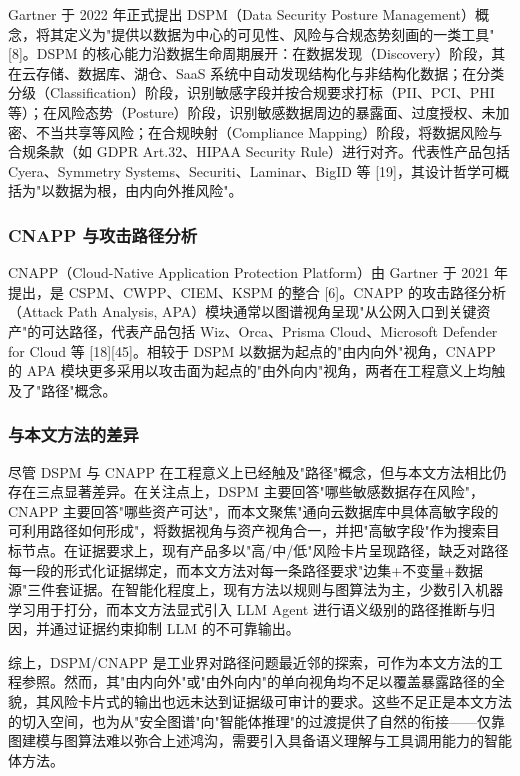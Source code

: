\documentclass[a4paper,12pt]{ctexart}
\begin{document}
Gartner 于 2022 年正式提出 DSPM（Data Security Posture Management）概念，将其定义为"提供以数据为中心的可见性、风险与合规态势刻画的一类工具" [8]。DSPM 的核心能力沿数据生命周期展开：在数据发现（Discovery）阶段，其在云存储、数据库、湖仓、SaaS 系统中自动发现结构化与非结构化数据；在分类分级（Classification）阶段，识别敏感字段并按合规要求打标（PII、PCI、PHI 等）；在风险态势（Posture）阶段，识别敏感数据周边的暴露面、过度授权、未加密、不当共享等风险；在合规映射（Compliance Mapping）阶段，将数据风险与合规条款（如 GDPR Art.32、HIPAA Security Rule）进行对齐。代表性产品包括 Cyera、Symmetry Systems、Securiti、Laminar、BigID 等 [19]，其设计哲学可概括为"以数据为根，由内向外推风险"。

\subsubsection{CNAPP 与攻击路径分析}

CNAPP（Cloud-Native Application Protection Platform）由 Gartner 于 2021 年提出，是 CSPM、CWPP、CIEM、KSPM 的整合 [6]。CNAPP 的攻击路径分析（Attack Path Analysis, APA）模块通常以图谱视角呈现"从公网入口到关键资产"的可达路径，代表产品包括 Wiz、Orca、Prisma Cloud、Microsoft Defender for Cloud 等 [18][45]。相较于 DSPM 以数据为起点的"由内向外"视角，CNAPP 的 APA 模块更多采用以攻击面为起点的"由外向内"视角，两者在工程意义上均触及了"路径"概念。

\subsubsection{与本文方法的差异}

尽管 DSPM 与 CNAPP 在工程意义上已经触及"路径"概念，但与本文方法相比仍存在三点显著差异。在关注点上，DSPM 主要回答"哪些敏感数据存在风险"，CNAPP 主要回答"哪些资产可达"，而本文聚焦"通向云数据库中具体高敏字段的可利用路径如何形成"，将数据视角与资产视角合一，并把"高敏字段"作为搜索目标节点。在证据要求上，现有产品多以"高/中/低"风险卡片呈现路径，缺乏对路径每一段的形式化证据绑定，而本文方法对每一条路径要求"边集+不变量+数据源"三件套证据。在智能化程度上，现有方法以规则与图算法为主，少数引入机器学习用于打分，而本文方法显式引入 LLM Agent 进行语义级别的路径推断与归因，并通过证据约束抑制 LLM 的不可靠输出。

综上，DSPM/CNAPP 是工业界对路径问题最近邻的探索，可作为本文方法的工程参照。然而，其"由内向外"或"由外向内"的单向视角均不足以覆盖暴露路径的全貌，其风险卡片式的输出也远未达到证据级可审计的要求。这些不足正是本文方法的切入空间，也为从"安全图谱"向"智能体推理"的过渡提供了自然的衔接——仅靠图建模与图算法难以弥合上述鸿沟，需要引入具备语义理解与工具调用能力的智能体方法。
\end{document}
